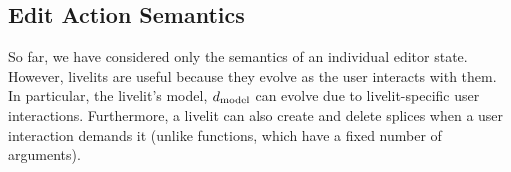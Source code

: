 \subsection{Edit Action Semantics}
So far, we have considered only the semantics of an individual editor state.
However, livelits are useful because they evolve as the user interacts
with them. In particular, the livelit's model, $d_\text{model}$ can evolve
due to livelit-specific user interactions. Furthermore, a livelit can also 
create and delete splices when a user interaction demands it (unlike functions, which have a fixed 
number of arguments).

